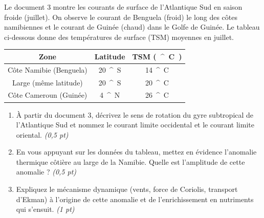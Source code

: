 \documentclass[11pt]{article}
\providecommand{\degree}{^{\circ}}
\begin{document}
\begin{exercice}
\label{exo:upwelling}
Le document 3 montre les courants de surface de l'Atlantique Sud en saison froide (juillet). On observe le courant de Benguela (froid) le long des côtes namibiennes et le courant de Guinée (chaud) dans le Golfe de Guinée. Le tableau ci-dessous donne des températures de surface (TSM) moyennes en juillet.

\begin{center}
\begin{tabular}{|c|c|c|}
\hline
\textbf{Zone} & \textbf{Latitude} & \textbf{TSM (\SI{}{\degree}C)} \\ \hline
Côte Namibie (Benguela) & \SI{20}{\degree}S & \SI{14}{\degree}C \\ \hline
Large (même latitude) & \SI{20}{\degree}S & \SI{20}{\degree}C \\ \hline
Côte Cameroun (Guinée) & \SI{4}{\degree}N & \SI{26}{\degree}C \\ \hline
\end{tabular}
\end{center}

\begin{enumerate}
    \item À partir du document 3, décrivez le sens de rotation du gyre subtropical de l'Atlantique Sud et nommez le courant limite occidental et le courant limite oriental. \textit{(0,5 pt)}
    \item En vous appuyant sur les données du tableau, mettez en évidence l'anomalie thermique côtière au large de la Namibie. Quelle est l'amplitude de cette anomalie ? \textit{(0,5 pt)}
    \item Expliquez le mécanisme dynamique (vents, force de Coriolis, transport d'Ekman) à l'origine de cette anomalie et de l'enrichissement en nutriments qui s'ensuit. \textit{(1 pt)}
\end{enumerate}
\end{exercice}
\end{document}
